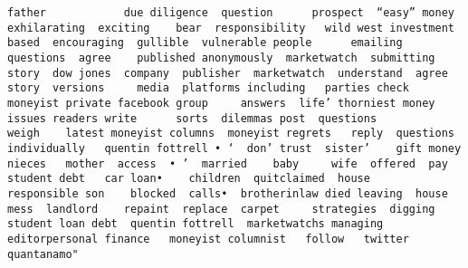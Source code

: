 \documentclass[
]{article}
\begin{document}
\begin{verbatim}
father            due diligence  question      prospect  “easy” money   exhilarating  exciting    bear  responsibility   wild west investment     based  encouraging  gullible  vulnerable people      emailing  questions  agree    published anonymously  marketwatch  submitting  story  dow jones  company  publisher  marketwatch  understand  agree      story  versions     media  platforms including   parties check   moneyist private facebook group     answers  life’ thorniest money issues readers write      sorts  dilemmas post  questions           weigh    latest moneyist columns  moneyist regrets   reply  questions individually   quentin fottrell • ‘  don’ trust  sister’    gift money   nieces   mother  access  • ’  married    baby     wife  offered  pay    student debt   car loan•    children  quitclaimed  house    responsible son    blocked  calls•  brotherinlaw died leaving  house   mess  landlord    repaint  replace  carpet     strategies  digging   student loan debt  quentin fottrell  marketwatchs managing editorpersonal finance   moneyist columnist   follow   twitter quantanamo"                                                                                                                                                                                                                                                                                                                                                                                                                                                                                                                                                                                                                                                                                                                                                                                                                                                                                                                                                                                                                                                                                                                                                                                                                                                                                                                                                                                                                                                                                                                                                                                                                                                                                                                                                                                                                                                                                                                                                                                                                                                                                                                                                                                                                                                                                                            
\end{verbatim}
\end{document}
